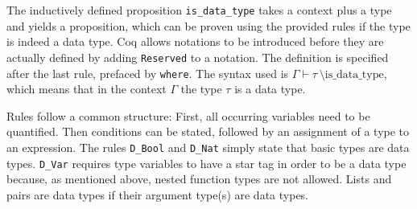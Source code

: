 \documentclass[paper = a4, fleqn, abstract=on, twoside]{scrreprt}
\newcommand{\coqinline}[1]{\texttt{#1}}
\begin{document}
The inductively defined proposition \coqinline{is_data_type} takes a context plus a type and yields a proposition, which can be proven using the provided rules if the type is indeed a data type. Coq allows notations to be introduced before they are actually defined by adding \coqinline{Reserved} to a notation. The definition is specified after the last rule, prefaced by \coqinline{where}. The syntax used is $\Gamma \vdash \tau \: \text{\textbackslash is\_data\_type}$, which means that in the context $\Gamma$ the type $\tau$ is a data type.
\par
Rules follow a common structure: First, all occurring variables need to be quantified. Then conditions can be stated, followed by an assignment of a type to an expression.
The rules \coqinline{D_Bool} and \coqinline{D_Nat} simply state that basic types are data types. \coqinline{D_Var} requires type variables to have a star tag in order to be a data type because, as mentioned above, nested function types are not allowed. Lists and pairs are data types if their argument type(s) are data types. 
\par
\end{document}
